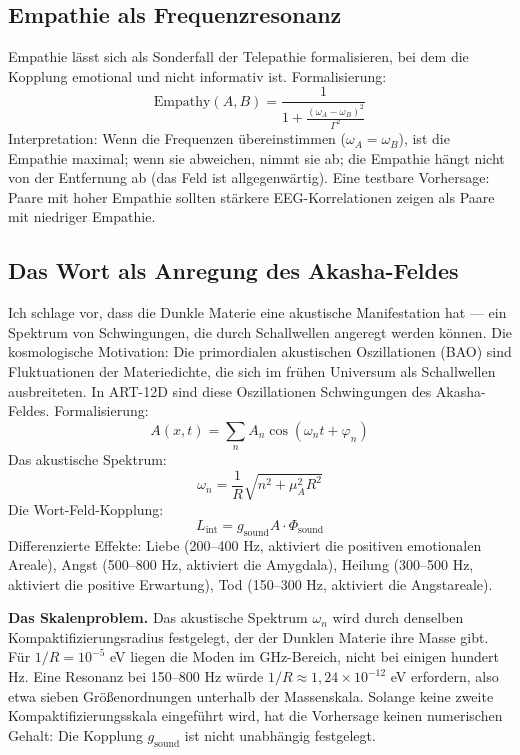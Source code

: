 \subsection{Empathie als Frequenzresonanz}
Empathie lässt sich als Sonderfall der Telepathie formalisieren, bei dem die Kopplung emotional und nicht informativ ist. Formalisierung:
\begin{equation}
\text{Empathy}(A,B) = \frac{1}{1 + \frac{(\omega_A - \omega_B)^2}{\Gamma^2}}
\end{equation}
Interpretation: Wenn die Frequenzen übereinstimmen ($\omega_A = \omega_B$), ist die Empathie maximal; wenn sie abweichen, nimmt sie ab; die Empathie hängt nicht von der Entfernung ab (das Feld ist allgegenwärtig). Eine testbare Vorhersage: Paare mit hoher Empathie sollten stärkere EEG-Korrelationen zeigen als Paare mit niedriger Empathie.

\subsection{Das Wort als Anregung des Akasha-Feldes}
Ich schlage vor, dass die Dunkle Materie eine akustische Manifestation hat --- ein Spektrum von Schwingungen, die durch Schallwellen angeregt werden können. Die kosmologische Motivation: Die primordialen akustischen Oszillationen (BAO) sind Fluktuationen der Materiedichte, die sich im frühen Universum als Schallwellen ausbreiteten. In ART-12D sind diese Oszillationen Schwingungen des Akasha-Feldes. Formalisierung:
\begin{equation}
A(x,t) = \sum_n A_n \cos(\omega_n t + \varphi_n)
\end{equation}
Das akustische Spektrum:
\begin{equation}
\omega_n = \frac{1}{R} \sqrt{n^2 + \mu_A^2 R^2}
\end{equation}
Die Wort-Feld-Kopplung:
\begin{equation}
L_{\text{int}} = g_{\text{sound}} A \cdot \Phi_{\text{sound}}
\end{equation}
Differenzierte Effekte: Liebe (200--400 Hz, aktiviert die positiven emotionalen Areale), Angst (500--800 Hz, aktiviert die Amygdala), Heilung (300--500 Hz, aktiviert die positive Erwartung), Tod (150--300 Hz, aktiviert die Angstareale).

\textbf{Das Skalenproblem.} Das akustische Spektrum $\omega_n$ wird durch denselben Kompaktifizierungsradius festgelegt, der der Dunklen Materie ihre Masse gibt. Für $1/R = 10^{-5}$ eV liegen die Moden im GHz-Bereich, nicht bei einigen hundert Hz. Eine Resonanz bei 150--800 Hz würde $1/R \approx 1,24\times10^{-12}$ eV erfordern, also etwa sieben Größenordnungen unterhalb der Massenskala. Solange keine zweite Kompaktifizierungsskala eingeführt wird, hat die Vorhersage keinen numerischen Gehalt: Die Kopplung $g_{\text{sound}}$ ist nicht unabhängig festgelegt.


